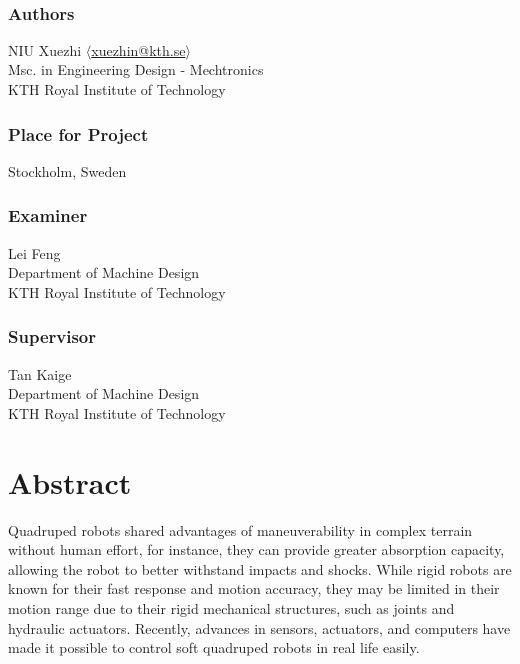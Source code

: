\newpage
\thispagestyle{plain}
~\\
\vfill
{ 
	\subsection*{Authors}
	NIU Xuezhi { }$\langle$\href{mailto:xuezhin@kth.se}{xuezhin@kth.se}$\rangle$\\
    Msc. in Engineering Design - Mechtronics \\
	KTH Royal Institute of Technology
	
	\subsection*{Place for Project}
	Stockholm, Sweden
	
	\subsection*{Examiner}
	Lei Feng \\
	Department of Machine Design \\
	KTH Royal Institute of Technology
	
	\subsection*{Supervisor }
	Tan Kaige\\
    Department of Machine Design\\
	KTH Royal Institute of Technology
	~
}


\newpage
\chapter*{Abstract}

Quadruped robots shared advantages of maneuverability in complex terrain without human effort, for instance, they can provide greater absorption capacity, allowing the robot to better withstand impacts and shocks. While rigid robots are known for their fast response and motion accuracy, they may be limited in their motion range due to their rigid mechanical structures, such as joints and hydraulic actuators. Recently, advances in sensors, actuators, and computers have made it possible to control soft quadruped robots in real life easily.


